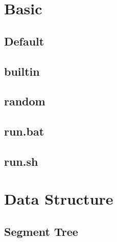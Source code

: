 \documentclass[a4paper,10pt,twocolumn,oneside]{article}
\begin{document}
        \pagestyle{fancy}
        \fancyfoot{}
        \fancyhead[R]{\thepage}
        \renewcommand{\headrulewidth}{0.4pt}
        \renewcommand{\contentsname}{Contents} 
        
        \newcommand{\includetex}[2]{
            \subsection{#1}
            
            \vspace{-1.2em}
            }
            \scriptsize
            \tableofcontents
            
\section{Basic}
    \subsection{Default}
    

    \subsection{builtin}
    

    \subsection{random}
    

    \subsection{run.bat}
    

    \subsection{run.sh}
    

\section{Data Structure}
    \subsection{Segment Tree}
    
\end{document}
